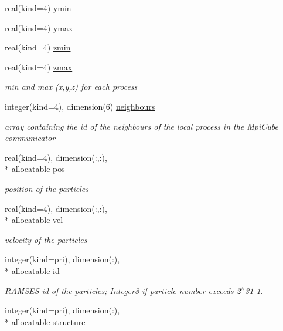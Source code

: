 \begin{DoxyCompactItemize}
\item 
real(kind=4) \hyperlink{classmodvariables_af09b8e9f670d2074a46c55ed90661609}{ymin}
\item 
real(kind=4) \hyperlink{classmodvariables_aa84922c68231d1c3496d3a7d210a62e7}{ymax}
\item 
real(kind=4) \hyperlink{classmodvariables_aa88314239681eb1c24673391f4612eb3}{zmin}
\item 
real(kind=4) \hyperlink{classmodvariables_ab9a39f4e4f686b80011f46a2f88617c1}{zmax}
\begin{DoxyCompactList}\small\item\em min and max (x,y,z) for each process \end{DoxyCompactList}\item 
integer(kind=4), dimension(6) \hyperlink{classmodvariables_ad84b74b636d64be51d7aba857b4b5c05}{neighbours}
\begin{DoxyCompactList}\small\item\em array containing the id of the neighbours of the local process in the Mpi\-Cube communicator \end{DoxyCompactList}\item 
real(kind=4), dimension(\-:,\-:), \\*
allocatable \hyperlink{classmodvariables_a2f72d5750b0cf2e9bfa6e139d09c6862}{pos}
\begin{DoxyCompactList}\small\item\em position of the particles \end{DoxyCompactList}\item 
real(kind=4), dimension(\-:,\-:), \\*
allocatable \hyperlink{classmodvariables_a9f11e44143a4c5cd47740e58712bbe1c}{vel}
\begin{DoxyCompactList}\small\item\em velocity of the particles \end{DoxyCompactList}\item 
integer(kind=pri), dimension(\-:), \\*
allocatable \hyperlink{classmodvariables_ac2069a0665c46610db9e57a5d5eaf195}{id}
\begin{DoxyCompactList}\small\item\em R\-A\-M\-S\-E\-S id of the particles; Integer8 if particle number exceeds 2$^\wedge$31-\/1. \end{DoxyCompactList}\item 
integer(kind=pri), dimension(\-:), \\*
allocatable \hyperlink{classmodvariables_a93c25eb46b5370bd8153733e03f3008d}{structure}

\end{DoxyCompactItemize}
